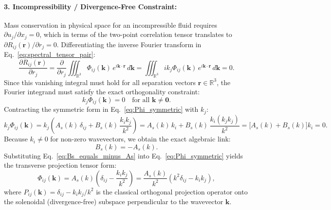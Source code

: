 \documentclass[lineno]{jfm}
\begin{document}
\paragraph{3. Incompressibility / Divergence-Free Constraint:}
Mass conservation in physical space for an incompressible fluid requires $\partial u_j / \partial x_j = 0$, which in terms of the two-point correlation tensor translates to $\partial R_{ij}(\mathbf{r}) / \partial r_j = 0$. Differentiating the inverse Fourier transform in Eq.~\eqref{eq:spectral_tensor_pair}:
\begin{equation}
\frac{\partial R_{ij}(\mathbf{r})}{\partial r_j} = \frac{\partial}{\partial r_j} \iiint_{\mathbb{R}^3} \Phi_{ij}(\mathbf{k})\,e^{i \mathbf{k} \cdot \mathbf{r}}\,d\mathbf{k} = \iiint_{\mathbb{R}^3} i k_j \Phi_{ij}(\mathbf{k})\,e^{i \mathbf{k} \cdot \mathbf{r}}\,d\mathbf{k} = 0.
\end{equation}
Since this vanishing integral must hold for all separation vectors $\mathbf{r} \in \mathbb{R}^3$, the Fourier integrand must satisfy the exact orthogonality constraint:
\begin{equation}
k_j \Phi_{ij}(\mathbf{k}) = 0 \quad \text{for all } \mathbf{k} \neq \mathbf{0}.
\label{eq:fourier_continuity}
\end{equation}
Contracting the symmetric form in Eq.~\eqref{eq:Phi_symmetric} with $k_j$:
\begin{equation}
k_j \Phi_{ij}(\mathbf{k}) = k_j \left( A_s(k)\,\delta_{ij} + B_s(k)\,\frac{k_i k_j}{k^2} \right) = A_s(k)\,k_i + B_s(k)\,\frac{k_i (k_j k_j)}{k^2} = \big[ A_s(k) + B_s(k) \big] k_i = 0.
\end{equation}
Because $k_i \neq 0$ for non-zero wavevectors, we obtain the exact algebraic link:
\begin{equation}
B_s(k) = -A_s(k).
\label{eq:Bs_equals_minus_As}
\end{equation}
Substituting Eq.~\eqref{eq:Bs_equals_minus_As} into Eq.~\eqref{eq:Phi_symmetric} yields the transverse projection tensor form:
\begin{equation}
\Phi_{ij}(\mathbf{k}) = A_s(k) \left( \delta_{ij} - \frac{k_i k_j}{k^2} \right) = \frac{A_s(k)}{k^2} \left( k^2 \delta_{ij} - k_i k_j \right),
\label{eq:Phi_projected}
\end{equation}
where $P_{ij}(\mathbf{k}) = \delta_{ij} - k_i k_j / k^2$ is the classical orthogonal projection operator onto the solenoidal (divergence-free) subspace perpendicular to the wavevector $\mathbf{k}$.
\end{document}
